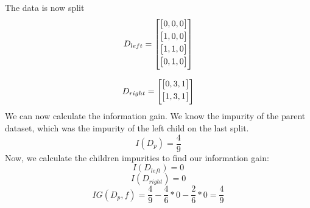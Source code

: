 \documentclass{article}
\begin{document}
The data is now split
$$D_{left} = 
            \begin{bmatrix}
            \vspace{1mm}
            \begin{bmatrix}
             0, 0, 0 \\
             \end{bmatrix} \\
            \vspace{1mm}
            \begin{bmatrix}
             1, 0, 0 \\
            \end{bmatrix} \\
            \vspace{1mm}
            \begin{bmatrix}
             1,1,0 \\ 
             \end{bmatrix} \\
            \vspace{1mm}
             \begin{bmatrix}
             0,1,0 \\
             \end{bmatrix} \\
             \end{bmatrix}
            $$

            $$D_{right} = 
        \begin{bmatrix}
         \vspace{1mm}
         \begin{bmatrix}
         0,3,1 \\
         \end{bmatrix} \\
         \vspace{1mm}
         \begin{bmatrix}
         1,3,1 \\
         \end{bmatrix} \\
         \end{bmatrix}
        $$
We can now calculate the information gain. We know the impurity of the parent dataset, which was the impurity of the left child on the last split.
\[I(D_p) = \frac{4}{9}\]
Now, we calculate the children impurities to find our information gain:
\[I(D_{left}) = 0\]
\[I(D_{right}) = 0\]
\[IG(D_p, f) = \frac{4}{9} - \frac{4}{6}*0 - \frac{2}{6}*0 = \frac{4}{9}\]
\end{document}
